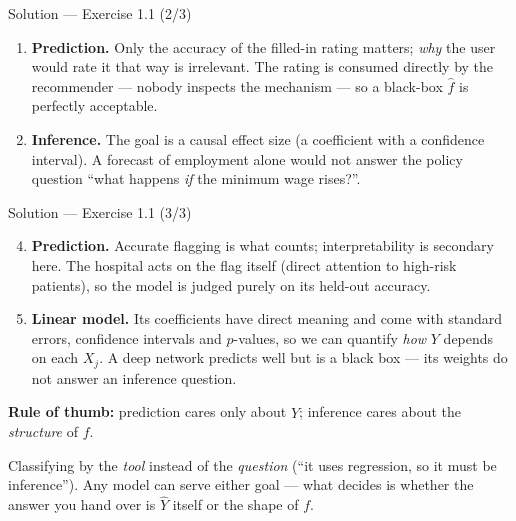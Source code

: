 \documentclass[aspectratio=169,11pt]{beamer}
\begin{document}
\begin{frame}{Solution --- Exercise 1.1 (2/3)}
\begin{solutionbox}
  \begin{enumerate}
  \item \textbf{Prediction.} Only the accuracy of the filled-in rating
        matters; \emph{why} the user would rate it that way is
        irrelevant. The rating is consumed directly by the recommender
        --- nobody inspects the mechanism --- so a black-box $\hat f$
        is perfectly acceptable.
  \item \textbf{Inference.} The goal is a causal effect size (a
        coefficient with a confidence interval). A forecast of
        employment alone would not answer the policy question ``what
        happens \emph{if} the minimum wage rises?''.
\end{enumerate}
\end{solutionbox}
\end{frame}

\begin{frame}{Solution --- Exercise 1.1 (3/3)}
\begin{solutionbox}
\begin{enumerate}\setcounter{enumi}{3}
  \item \textbf{Prediction.} Accurate flagging is what counts;
        interpretability is secondary here. The hospital acts on the
        flag itself (direct attention to high-risk patients), so the
        model is judged purely on its held-out accuracy.
  \item \textbf{Linear model.} Its coefficients have direct meaning
        and come with standard errors, confidence intervals and
        $p$-values, so we can quantify \emph{how} $Y$ depends on each
        $X_j$. A deep network predicts well but is a black box --- its
        weights do not answer an inference question.
\end{enumerate}
\textbf{Rule of thumb:} prediction cares only about $\hat Y$;
inference cares about the \emph{structure} of $f$.
\end{solutionbox}
\begin{mistake}
Classifying by the \emph{tool} instead of the
\emph{question} (``it uses regression, so it must be inference'').
Any model can serve either goal --- what decides is whether the answer
you hand over is $\hat Y$ itself or the shape of $f$.
\end{mistake}
\end{frame}
\end{document}
